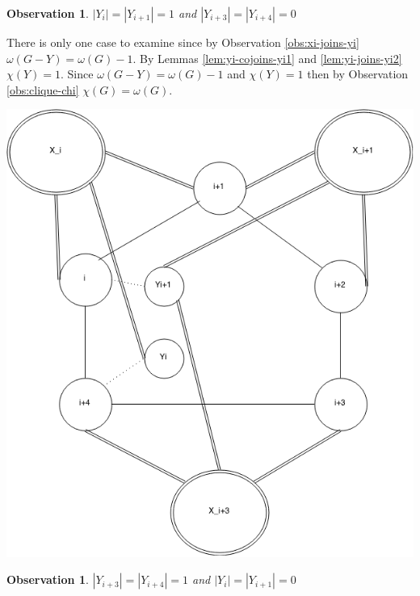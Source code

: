 \documentclass[12pt]{article}
\newtheorem{Observation}[Theorem]{Observation}
\begin{document}
\begin{Observation}\label{obs:yi-yi1}
$|Y_{i}| = |Y_{i+1}| = 1$ and $|Y_{i+3}| = |Y_{i+4}| = 0$
\end{Observation}

\begin{minipage}{0.5\textwidth}%
	 There is only one case to examine since by Observation \ref{obs:xi-joins-yi} $\omega(G - Y) = \omega(G) - 1 $. By Lemmas \ref{lem:yi-cojoins-yi1} and \ref{lem:yi-joins-yi2}  $\chi(Y) = 1$. Since $\omega(G - Y) = \omega(G) - 1$ and $\chi(Y) =1 $ then by Observation \ref{obs:clique-chi} $\chi(G) = \omega(G)$.
\end{minipage}
\hfill
\begin{minipage}{0.5\textwidth}\raggedleft
	\includegraphics[width=\linewidth]{Yi-Yi1.png}
\end{minipage}



\begin{Observation}\label{obs:yi3-yi4}
$|Y_{i+3}| = |Y_{i+4}| = 1$ and $|Y_{i}| = |Y_{i+1}| = 0$
\end{Observation}
\end{document}
